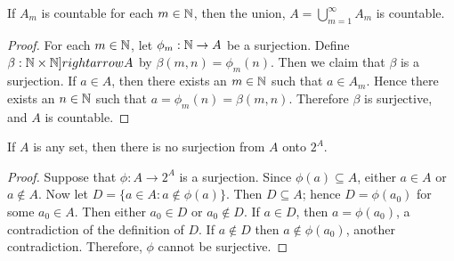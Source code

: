 \begin{theorem}
    If $A_m$ is countable for each $m \in \mathbb{N}$, then the union,  $A=\bigcup_{m=1}^{\infty} A_m$ is countable.
\end{theorem}
\begin{proof}
    For each $m \in \mathbb{N}$, let  $\phi_m:\mathbb{N} \rightarrow A$ be a surjection. Define  $\beta: \mathbb{N} \times \mathbb{N} ]rightarrow A$ by 
    $\beta(m,n)=\phi_m(n)$. Then we claim that $\beta$ is a surjection. If  $a \in A$, then there exists an  $m \in \mathbb{N}$ such 
    that  $a \in A_m$. Hence there exists an  $n \in \mathbb{N}$ such that  $a=\phi_m(n)=\beta(m,n)$. Therefore  $\beta$ is surjective, 
    and  $A$ is countable.
\end{proof}

\begin{theorem}
    If $A$ is any set, then there is no surjection from  $A$ onto  $2^{A}$.
\end{theorem}
\begin{proof}
    Suppose that $\phi:A \rightarrow 2^{A}$ is a surjection. Since $\phi(a) \subseteq A$, either  $a \in A$ or  $a \notin A$. 
    Now let $D=\{a \in A: a \notin \phi(a) \}$. Then $D \subseteq A$; hence $D=\phi(a_0)$ for some $ a_0 \in A$. Then either 
    $a_0 \in D$ or $a_0 \notin D$. If $a \in D$, then $a=\phi(a_0)$, a contradiction of the definition of $D$. If  $a \notin D$ 
    then $a \notin \phi(a_0)$, another contradiction. Therefore, $\phi$ cannot be surjective.
\end{proof}

